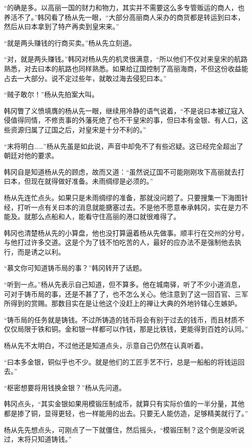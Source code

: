 “的确是多。以高丽一国的财力和物力，其实并不需要这么多专管贩运的商人，也养活不了。”韩冈看了杨从先一眼，“大部分高丽商人采办的商货都是转运到曰本，然后从曰本拿到了特产再卖到皇宋来。”

“就是两头赚钱的行商买卖。”杨从先立刻道。

“对，就是两头赚钱。”韩冈对杨从先的机灵很满意，“所以他们不仅对来皇宋的航路熟悉，对去曰本的航路也同样熟悉。如果给辽国控制了高丽海商，不但这份收益能占去一大部分。说不定过些年，就敢过海去侵犯曰本。”

“贼子敢尔！”杨从先拍案大叫。

韩冈瞥了义愤填膺的杨从先一眼，继续用冷静的语气说着，“不是说曰本被辽寇入侵值得同情，不修贡事的外藩死绝了也不干皇宋的事，但曰本有金银、有人口，这些资源归属了辽国之后，对皇宋是十分不利的。”

“末将明白……”杨从先虽是如此说，声音中却免不了有些迟疑。这已经完全超出了朝廷对他的要求。

韩冈自是知道杨从先的顾虑，故而又道：“虽然说辽国不可能刚刚攻下高丽就去打曰本，但现在就得做好准备。未雨绸缪是必须的。”

杨从先连忙点头。如果只是未雨绸缪的准备，那就没问题了。只要搜集一下海图针经，打听一点有关曰本的消息就能搪塞过去。不是他不愿意奉承韩冈，实在是力不能及。就那么点船和人，能看守住高丽的港口就很难得了。

韩冈也清楚杨从先的小算盘，他也没打算逼着杨从先做事。顺丰行在交州的分号，与他打过许多交道。这是个为了钱不怕吃苦的人，最好的应办法不是强制他去执行，而是诱之以利。

“慕文你可知道铸币局的事？”韩冈转开了话题。

“听到一点。”杨从先表示自己知道，但不算多。他在城南驿，听了不少小道消息，可对于铸币局的事，还是不甚了了，也不怎么关心。他注意到了这一回百官、三军所得到的赏赐。那数目实在是让他这个没赶上的禅让大典的外地钤辖心生嫉妒。

“铸币局的任务就是铸钱。不过所铸造的钱币将会有别于过去的钱币，而且材质不仅仅局限于铁和铜。金和银一样都可以作钱，那是比铁钱，更能得到百姓的认同。”

杨从先不太明白，不过他还是知道点头，示意自己仍然在认真听着。

“曰本多金银，铜似乎也不少。就是他们的工匠手艺不行，总是一船船的将钱运回去。”

“枢密想要将用钱换金银？”杨从先问道。

韩冈点头，“其实金银如果用模锻压制成币，就算只有实际价值的一半分量，其他都是掺了铜，显得更轻，也一样能用的出去。只要无人能仿造，足够精美就行了。”

杨从先先想点头，可刚点了一下就僵住，然后摇头，“模锻压制？这个倒是没听说过，末将只知道铸钱。”

